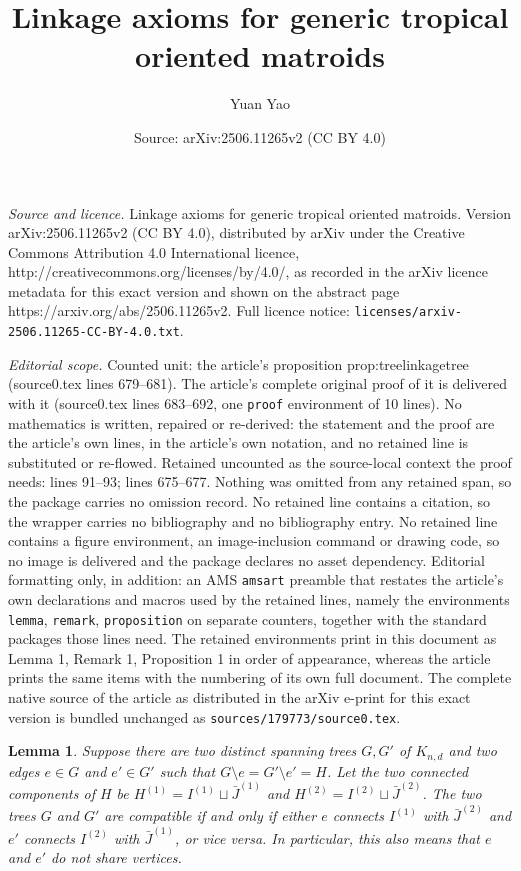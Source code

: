 \documentclass[10pt,a4paper]{amsart}
\title{Linkage axioms for generic tropical oriented matroids}
\author{Yuan Yao}
\date{Source: arXiv:2506.11265v2 (CC BY 4.0)}
\newtheorem{lemma}{Lemma}
\begin{document}
\maketitle

\noindent\emph{Source and licence.} Linkage axioms for generic tropical oriented matroids. Version arXiv:2506.11265v2 (CC BY 4.0), distributed by arXiv under the Creative Commons Attribution 4.0 International licence, http://creativecommons.org/licenses/by/4.0/, as recorded in the arXiv licence metadata for this exact version and shown on the abstract page https://arxiv.org/abs/2506.11265v2. Full licence notice: \texttt{licenses/arxiv-2506.11265-CC-BY-4.0.txt}.\par\smallskip

\noindent\textit{Editorial scope.} Counted unit: the article's proposition prop:treelinkagetree (source0.tex lines 679--681). The article's complete original proof of it is delivered with it (source0.tex lines 683--692, one \texttt{proof} environment of 10 lines). No mathematics is written, repaired or re-derived: the statement and the proof are the article's own lines, in the article's own notation, and no retained line is substituted or re-flowed.  Retained uncounted as the source-local context the proof needs: lines 91--93; lines 675--677.  Nothing was omitted from any retained span, so the package carries no omission record.  No retained line contains a citation, so the wrapper carries no bibliography and no bibliography entry.  No retained line contains a figure environment, an image-inclusion command or drawing code, so no image is delivered and the package declares no asset dependency.  Editorial formatting only, in addition: an AMS \texttt{amsart} preamble that restates the article's own declarations and macros used by the retained lines, namely the environments \texttt{lemma}, \texttt{remark}, \texttt{proposition} on separate counters, together with the standard packages those lines need.  The retained environments print in this document as Lemma 1, Remark 1, Proposition 1 in order of appearance, whereas the article prints the same items with the numbering of its own full document.  The complete native source of the article as distributed in the arXiv e-print for this exact version is bundled unchanged as \texttt{sources/179773/source0.tex}.
\begin{lemma}\label{lem:adjtrees}
    Suppose there are two distinct spanning trees $G, G'$ of $K_{n,d}$ and two edges $e\in G$ and $e'\in G'$ such that $G\setminus e = G' \setminus e' = H$. Let the two connected components of $H$ be $H^{(1)} = I^{(1)}\sqcup \bar{J}^{(1)}$ and $H^{(2)} = I^{(2)}\sqcup \bar{J}^{(2)}$. The two trees $G$ and $G'$ are compatible if and only if either $e$ connects $I^{(1)}$ with $\bar{J}^{(2)}$ and $e'$ connects $I^{(2)}$ with $\bar{J}^{(1)}$, or vice versa. In particular, this also means that $e$ and $e'$ do not share vertices.
\end{lemma}
\end{document}
